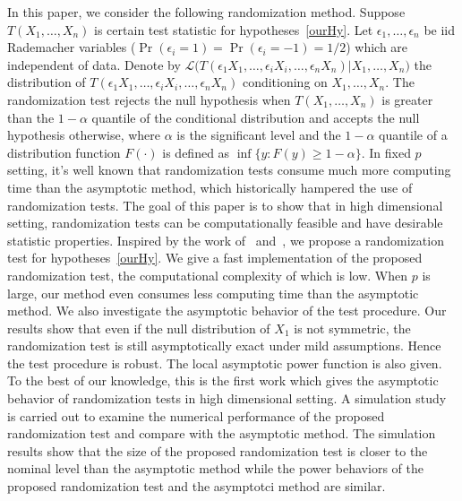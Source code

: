 \documentclass[review]{elsarticle}
\theoremstyle{plain}
\theoremstyle{definition}
\theoremstyle{remark}
\begin{document}
In this paper, we consider the following randomization method.
Suppose $T(X_1,\ldots,X_n)$ is certain test statistic for hypotheses~\eqref{ourHy}.
Let $\epsilon_1,\ldots,\epsilon_n$ be iid Rademacher variables ($\Pr(\epsilon_i=1)=\Pr(\epsilon_i=-1)=1/2$) which are independent of data.
Denote by
    $
    \mathcal{L}\big(T(\epsilon_1 X_1,\ldots,\epsilon_i X_i,\ldots,\epsilon_n X_n)|X_1,\ldots,X_n\big)
    $
 the distribution of $T(\epsilon_1 X_1,\ldots,\epsilon_i X_i,\ldots,\epsilon_n X_n)$ conditioning on $X_1,\ldots,X_n$.
 The randomization test rejects the null hypothesis when $T(X_1,\ldots, X_n)$ is greater than the $1-\alpha$ quantile of the conditional distribution and accepts the null hypothesis otherwise, where $\alpha$ is the significant level and the $1-\alpha$ quantile of a distribution function $F(\cdot)$ is defined as $\inf\{y: F(y)\geq 1-\alpha\}$.
In fixed $p$ setting, it's well known that randomization tests consume much more computing time than the asymptotic method, which  historically  hampered the use of randomization tests. 
The goal of this paper is to show that in high dimensional setting, randomization tests can be computationally feasible and have desirable statistic properties.
Inspired by the work of~\citet{Bai1996Efiect} and~\citet{Chen2010A}, we propose a randomization test for hypotheses~\eqref{ourHy}.
We give a fast implementation of the proposed randomization test, the computational complexity of which is low.
When $p$ is large, our method even consumes less computing time  than the asymptotic method.
We also investigate the asymptotic behavior of the test procedure.
Our results show that even if the null distribution of $X_1$ is not symmetric, the randomization test is still asymptotically exact under mild assumptions. 
Hence the test procedure is robust.
The local asymptotic power function is also given.
To the best of our knowledge, this is the first work which gives the asymptotic behavior of randomization tests in high dimensional setting.
A simulation study is carried out to examine the numerical performance of the proposed randomization test and compare with the asymptotic method.
The simulation results show that the size of the proposed randomization test is closer to the nominal level than the asymptotic method while the power behaviors of the proposed randomization test and the asymptotci method are similar.

\end{document}
